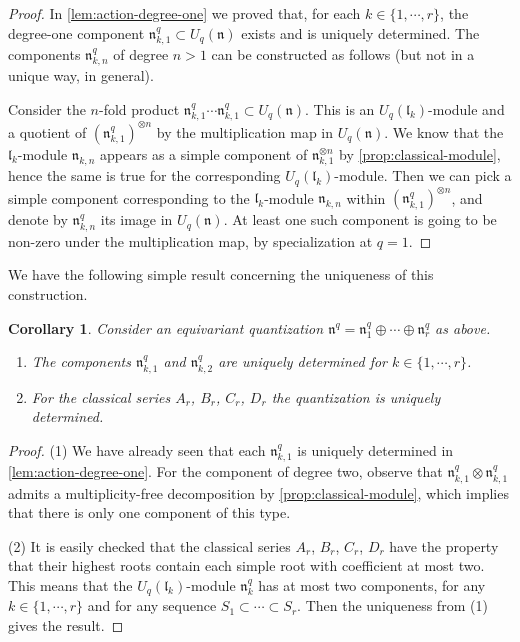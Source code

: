 \documentclass[a4paper, 12pt, reqno, english]{amsart}
\numberwithin{equation}{section}
\numberwithin{figure}{section}
\theoremstyle{plain}
\theoremstyle{plain}
\theoremstyle{plain}
\theoremstyle{plain}
\theoremstyle{plain}
\newtheorem{corollary}[theorem]{Corollary}
\theoremstyle{definition}
\theoremstyle{definition}
\theoremstyle{definition}
\theoremstyle{remark}
\theoremstyle{definition}
\theoremstyle{definition}
\newcommand{\Uqn}{U_q(\mathfrak{n})}
\newcommand{\Uqlk}{U_q(\mathfrak{l}_k)}
\newcommand{\liel}{\mathfrak{l}}
\newcommand{\lien}{\mathfrak{n}}
\newcommand{\qnil}{\lien^q}
\begin{document}
\begin{proof}
In \cref{lem:action-degree-one} we proved that, for each $k \in \{ 1, \cdots, r \}$, the degree-one component $\qnil_{k, 1} \subset \Uqn$ exists and is uniquely determined.
The components $\qnil_{k, n}$ of degree $n > 1$ can be constructed as follows (but not in a unique way, in general).

Consider the $n$-fold product $\qnil_{k, 1} \cdots \qnil_{k, 1} \subset \Uqn$.
This is an $U_q(\liel_k)$-module and a quotient of $(\qnil_{k, 1})^{\otimes n}$ by the multiplication map in $\Uqn$.
We know that the $\liel_k$-module $\lien_{k, n}$ appears as a simple component of $\lien_{k, 1}^{\otimes n}$ by \cref{prop:classical-module}, hence the same is true for the corresponding $U_q(\liel_k)$-module. Then we can pick a simple component corresponding to the $\liel_k$-module $\lien_{k, n}$ within $(\qnil_{k, 1})^{\otimes n}$, and denote by $\qnil_{k, n}$ its image in $\Uqn$.
At least one such component is going to be non-zero under the multiplication map, by specialization at $q = 1$.
\end{proof}

We have the following simple result concerning the uniqueness of this construction.

\begin{corollary}
\label{cor:uniqueness-quantization}
Consider an equivariant quantization $\qnil = \qnil_1 \oplus \cdots \oplus \qnil_r$ as above.
\begin{enumerate}
\item The components $\qnil_{k, 1}$ and $\qnil_{k, 2}$ are uniquely determined for $k \in \{ 1, \cdots, r \}$.
\item For the classical series $A_r$, $B_r$, $C_r$, $D_r$ the quantization is uniquely determined.
\end{enumerate}
\end{corollary}

\begin{proof}
(1) We have already seen that each $\qnil_{k, 1}$ is uniquely determined in \cref{lem:action-degree-one}.
For the component of degree two, observe that $\qnil_{k, 1} \otimes \qnil_{k, 1}$ admits a multiplicity-free decomposition by \cref{prop:classical-module}, which implies that there is only one component of this type.

(2) It is easily checked that the classical series $A_r$, $B_r$, $C_r$, $D_r$ have the property that their highest roots contain each simple root with coefficient at most two. This means that the $\Uqlk$-module $\qnil_k$ has at most two components, for any $k \in \{ 1, \cdots, r \}$ and for any sequence $S_1 \subset \cdots \subset S_r$.
Then the uniqueness from (1) gives the result.
\end{proof}
\end{document}
